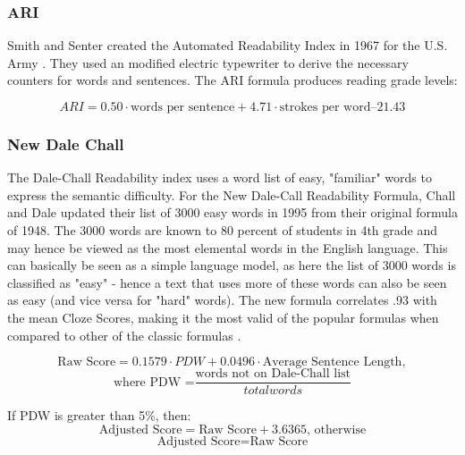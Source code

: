 \documentclass[runningheads,a4paper]{llncs}
\begin{document}
\subsubsection{ARI}

Smith and Senter  created the Automated Readability Index in 1967 for the U.S. Army \cite{Dubay2004}. They used an modified electric typewriter to derive the necessary counters for words and sentences.
The ARI formula produces reading grade levels:%

\begin{equation}
ARI = 0.50 \cdot \text{words per sentence} + 4.71 \cdot \text{strokes per word} – 21.43 
\end{equation}


\subsubsection{New Dale Chall} \label{sec:dale_chall}
The Dale-Chall Readability index uses a word list of easy, "familiar" words to express the semantic difficulty. For the New Dale-Call Readability Formula, Chall and Dale updated their list of 3000 easy words in 1995 from their original formula of 1948. The 3000 words are known to 80 percent of students in 4th grade and may hence be viewed as the most elemental words in the English language. This can basically be seen as a simple language model, as here the list of 3000 words is classified as "easy" - hence a text that uses more of these words can also be seen as easy (and vice versa for "hard" words). The new formula correlates .93 with the mean Cloze Scores, making it the most valid of the popular formulas when compared to other of the classic formulas \cite{Chall1995} \cite{Dubay2007}.

\begin{equation}
\text{Raw Score} = 0.1579 \cdot PDW + 0.0496 \cdot \text{Average Sentence Length},
\end{equation}
\begin{equation*}
\text{where PDW =} \frac{\text{words not on Dale-Chall list}}{total words}
\end{equation*}

If PDW is greater than 5\%, then:
\begin{equation*}
\text{Adjusted Score} = \text{Raw Score} + 3.6365\text{, otherwise}
\end{equation*}
\begin{equation*} \text{Adjusted Score} = \text{Raw Score}\end{equation*}
\end{document}
